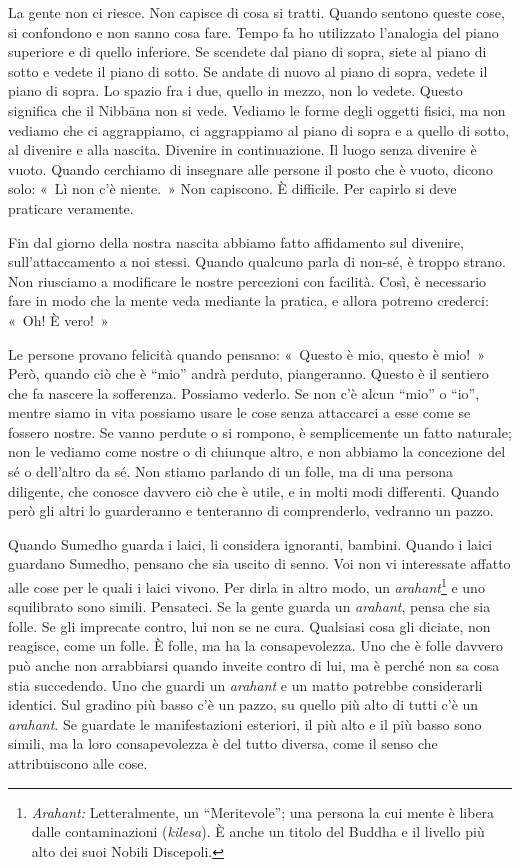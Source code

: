 La gente non ci riesce. Non capisce di cosa si tratti. Quando sentono
queste cose, si confondono e non sanno cosa fare. Tempo fa ho utilizzato
l'analogia del piano superiore e di quello inferiore. Se scendete dal
piano di sopra, siete al piano di sotto e vedete il piano di sotto. Se
andate di nuovo al piano di sopra, vedete il piano di sopra. Lo spazio
fra i due, quello in mezzo, non lo vedete. Questo significa che il
Nibbāna non si vede. Vediamo le forme degli oggetti fisici, ma
non vediamo che ci aggrappiamo, ci aggrappiamo al piano di sopra e a
quello di sotto, al divenire e alla nascita. Divenire in continuazione.
Il luogo senza divenire è vuoto. Quando cerchiamo di insegnare alle
persone il posto che è vuoto, dicono solo: «~Lì non c'è niente.~» Non
capiscono. È difficile. Per capirlo si deve praticare veramente.

Fin dal giorno della nostra nascita abbiamo fatto affidamento sul
divenire, sull'attaccamento a noi stessi. Quando qualcuno parla di
non-sé, è troppo strano. Non riusciamo a modificare le nostre percezioni
con facilità. Così, è necessario fare in modo che la mente veda mediante
la pratica, e allora potremo crederci: «~Oh! È vero!~»

Le persone provano felicità quando pensano: «~Questo è mio, questo è
mio!~» Però, quando ciò che è ``mio'' andrà perduto, piangeranno. Questo
è il sentiero che fa nascere la sofferenza. Possiamo vederlo. Se non c'è
alcun ``mio'' o ``io'', mentre siamo in vita possiamo usare le cose
senza attaccarci a esse come se fossero nostre. Se vanno perdute o si
rompono, è semplicemente un fatto naturale; non le vediamo come nostre o
di chiunque altro, e non abbiamo la concezione del sé o dell'altro da
sé. Non stiamo parlando di un folle, ma di una persona diligente, che
conosce davvero ciò che è utile, e in molti modi differenti. Quando però
gli altri lo guarderanno e tenteranno di comprenderlo, vedranno un
pazzo.

Quando Sumedho guarda i laici, li considera ignoranti, bambini. Quando i
laici guardano Sumedho, pensano che sia uscito di senno. Voi non vi
interessate affatto alle cose per le quali i laici vivono. Per dirla in
altro modo, un \emph{arahant}\footnote{\emph{Arahant:} Letteralmente, un
  ``Meritevole''; una persona la cui mente è libera dalle contaminazioni
  (\emph{kilesa}). È anche un titolo del Buddha e il livello più alto
  dei suoi Nobili Discepoli.} e uno squilibrato sono simili. Pensateci.
Se la gente guarda un \emph{arahant}, pensa che sia folle. Se gli
imprecate contro, lui non se ne cura. Qualsiasi cosa gli diciate, non
reagisce, come un folle. È folle, ma ha la consapevolezza. Uno che è
folle davvero può anche non arrabbiarsi quando inveite contro di lui, ma
è perché non sa cosa stia succedendo. Uno che guardi un \emph{arahant} e
un matto potrebbe considerarli identici. Sul gradino più basso c'è un
pazzo, su quello più alto di tutti c'è un \emph{arahant}. Se guardate le
manifestazioni esteriori, il più alto e il più basso sono simili, ma la
loro consapevolezza è del tutto diversa, come il senso che attribuiscono
alle cose.

